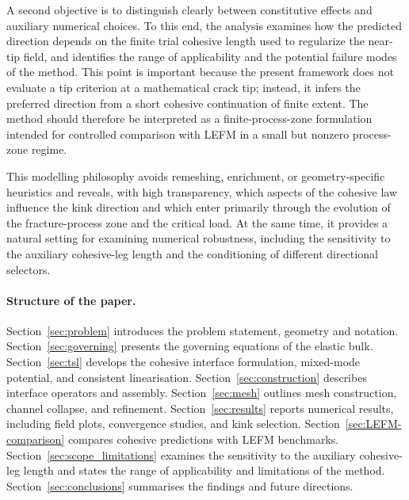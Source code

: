 \documentclass[smallextended]{svjour3}       %
\begin{document}
A second objective is to distinguish clearly between constitutive effects
and auxiliary numerical choices. To this end, the analysis examines how the
predicted direction depends on the finite trial cohesive length used to
regularize the near-tip field, and identifies the range of applicability
and the potential failure modes of the method. This point is important
because the present framework does not evaluate a tip criterion at a
mathematical crack tip; instead, it infers the preferred direction from a
short cohesive continuation of finite extent. The method should therefore
be interpreted as a finite-process-zone formulation intended for controlled
comparison with LEFM in a small but nonzero process-zone regime.

This modelling philosophy avoids remeshing, enrichment, or
geometry-specific heuristics and reveals, with high transparency, which
aspects of the cohesive law influence the kink direction and which enter
primarily through the evolution of the fracture-process zone and the
critical load. At the same time, it provides a natural setting for
examining numerical robustness, including the sensitivity to the auxiliary
cohesive-leg length and the conditioning of different directional
selectors.

\paragraph{Structure of the paper.}
Section~\ref{sec:problem} introduces the problem statement, geometry and
notation. Section~\ref{sec:governing} presents the governing equations of
the elastic bulk. Section~\ref{sec:tsl} develops the cohesive interface
formulation, mixed-mode potential, and consistent linearisation.
Section~\ref{sec:construction} describes interface operators and assembly.
Section~\ref{sec:mesh} outlines mesh construction, channel collapse, and
refinement. Section~\ref{sec:results} reports numerical results, including
field plots, convergence studies, and kink selection.
Section~\ref{sec:LEFM-comparison} compares cohesive predictions with LEFM
benchmarks. Section~\ref{sec:scope_limitations} examines the sensitivity
to the auxiliary cohesive-leg length and states the range of applicability
and limitations of the method. Section~\ref{sec:conclusions} summarises
the findings and future directions.
\end{document}
